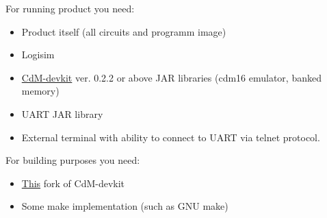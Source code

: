 For running product you need:

\begin{itemize}
	\item Product itself (all circuits and programm image)
	\item Logisim
	\item \href{https://github.com/cdm-processors/cdm-devkit}{CdM-devkit} ver. 0.2.2 or above JAR libraries (cdm16 emulator, banked memory)
	\item UART JAR library
	\item External terminal with ability to connect to UART via telnet protocol.
\end{itemize}

For building purposes you need:

\begin{itemize}
	\item \href{https://github.com/Proletcultist/cdm-devkit-macro-improvements}{This} fork of CdM-devkit
	\item Some make implementation (such as GNU make)
\end{itemize}
